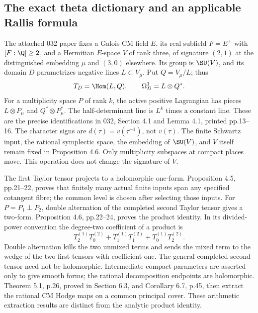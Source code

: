 
\subsection{The exact theta dictionary and an applicable Rallis formula}

The attached 032 paper fixes a Galois CM field $E$, its real subfield
$F=E^+$ with $[F:\Q]\geq2$, and a Hermitian $E$-space $V$ of rank three,
of signature $(2,1)$ at the distinguished embedding $\mu$ and $(3,0)$
elsewhere. Its group is $\SU(V)$, and its domain $D$ parametrizes negative
lines $L\subset V_\mu$. Put $Q=V_\mu/L$; thus
\[
 T_D=\Hom(L,Q),\qquad \Omega_D^1=L\otimes Q^*.
\]
For a multiplicity space $P$ of rank $k$, the active positive Lagrangian
has pieces $L\otimes P_\mu$ and $Q^*\otimes P_\mu^*$. The half-determinant
line is $L^k$ times a constant line. These are the precise identifications
in 032, Section 4.1 and Lemma 4.1, printed pp.13--16. The character signs
are $d(\tau)=v(\tau^{-1})$, not $v(\tau)$. The finite Schwartz input, the
rational symplectic space, the embedding of $\SU(V)$, and $V$ itself remain
fixed in Proposition 4.6. Only multiplicity subspaces at compact places
move. This operation does not change the signature of $V$.

The first Taylor tensor projects to a holomorphic one-form. Proposition
4.5, pp.21--22, proves that finitely many actual finite inputs span any
specified cotangent fibre; the common level is chosen after selecting
those inputs. For $P=P_1\perp P_2$, double alternation of the completed
second Taylor tensor gives a two-form. Proposition 4.6, pp.22--24, proves
the product identity. In its divided-power convention the degree-two
coefficient of a product is
\[
 T_2^{(1)}T_0^{(2)}+T_1^{(1)}T_1^{(2)}+T_0^{(1)}T_2^{(2)}.
\]
Double alternation kills the two unmixed terms and sends the mixed term
to the wedge of the two first tensors with coefficient one. The general
completed second tensor need not be holomorphic. Intermediate compact
parameters are asserted only to give smooth forms; the rational
decomposition endpoints are holomorphic. Theorem 5.1, p.26, proved in
Section 6.3, and Corollary 6.7, p.45, then extract the rational CM Hodge
maps on a common principal cover. These arithmetic extraction results
are distinct from the analytic product identity.

